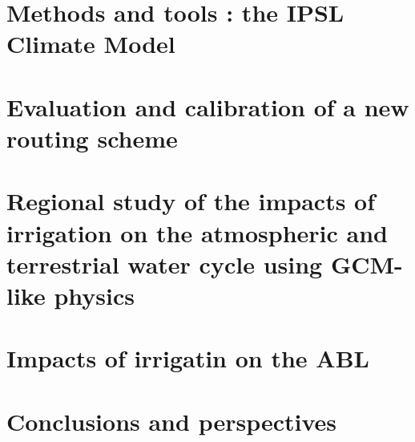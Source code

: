 \documentclass{report}
\begin{document}
\chapter{Methods and tools : the IPSL Climate Model}
\minitoc



\chapter{Evaluation and calibration of a new routing scheme}
\minitoc



\chapter{Regional study of the impacts of irrigation on the atmospheric and terrestrial water cycle using GCM-like physics}
\minitoc


\chapter{Impacts of irrigatin on the ABL}
\minitoc


\chapter{Conclusions and perspectives}

\newpage
\nocite{*} %

\newpage
\listoffigures
\newpage
\listoftables
\end{document}
